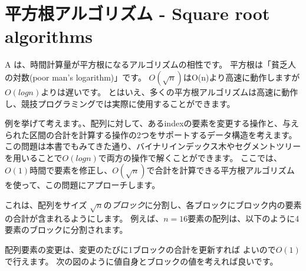 \chapter{平方根アルゴリズム - Square root algorithms}


A  は、時間計算量が平方根になるアルゴリズムの相性です。
平方根は「貧乏人の対数(poor man's logarithm)」です。
$O(\sqrt n)$はO(n)より高速に動作しますが$O(log n)$よりは遅いです。
とはいえ、多くの平方根アルゴリズムは高速に動作し、競技プログラミングでは実際に使用することができます。

例を挙げて考えます。、配列に対して、あるindexの要素を変更する操作と、与えられた区間の合計を計算する操作の2つをサポートするデータ構造を考えます。
この問題は本書でもみてきた通り、バイナリインデックス木やセグメントツリーを用いることで$O(log n)$で両方の操作で解くことができます。
ここでは、$O(1)$時間で要素を修正し、$O(\sqrt n)$で合計を計算できる平方根アルゴリズムを使って、この問題にアプローチします。

これは、配列をサイズ $\sqrt n$の\emph{ブロック}に分割し、各ブロックにブロック内の要素の合計が含まれるようにします。
例えば、$n=16$要素の配列は、以下のように4要素のブロックに分割されます。

\begin{center}
\end{center}


配列要素の変更は、変更のたびに1ブロックの合計を更新すれば よいので$O(1)$で行えます。
次の図のように値自身とブロックの値を考えれば良いです。


